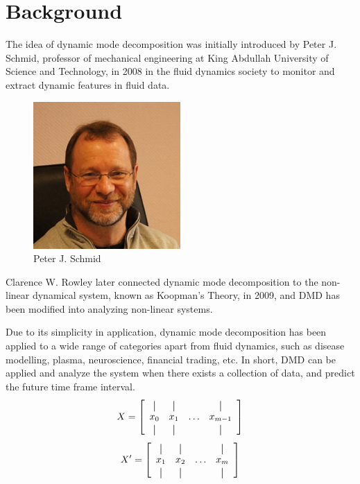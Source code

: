 \documentclass[12pt]{report}
\begin{document}
\section{Background}
The idea of dynamic mode decomposition was initially introduced by Peter J. Schmid, professor of mechanical engineering at King Abdullah University of Science and Technology, in 2008 in the fluid dynamics society to monitor and extract dynamic features in fluid data.
\begin{figure}
    \centering
    \includegraphics[width=0.5\textwidth]{Peter-Schmid-5.jpg}
    \caption{Peter J. Schmid}
\end{figure}
Clarence W. Rowley later connected dynamic mode decomposition to the non-linear dynamical system, known as Koopman's Theory, in 2009, and DMD has been modified into analyzing non-linear systems.

Due to its simplicity in application, dynamic mode decomposition has been applied to a wide range of categories apart from fluid dynamics, such as disease modelling, plasma, neuroscience, financial trading, etc. In short, DMD can be applied and analyze the system when there exists a collection of data, and predict the future time frame interval.
\newcommand*{\vertbar}{\rule[-1ex]{0.5pt}{2.5ex}}
\[
X = 
\left[
  \begin{array}{cccc}
    \vertbar & \vertbar &        & \vertbar \\
    x_{0}    & x_{1}    & \ldots & x_{m-1}    \\
    \vertbar & \vertbar &        & \vertbar 
  \end{array}
\right]
\]
\[
X' = 
\left[
  \begin{array}{cccc}
    \vertbar & \vertbar &        & \vertbar \\
    x_{1}    & x_{2}    & \ldots & x_{m}    \\
    \vertbar & \vertbar &        & \vertbar 
  \end{array}
\right]
\]
\end{document}
